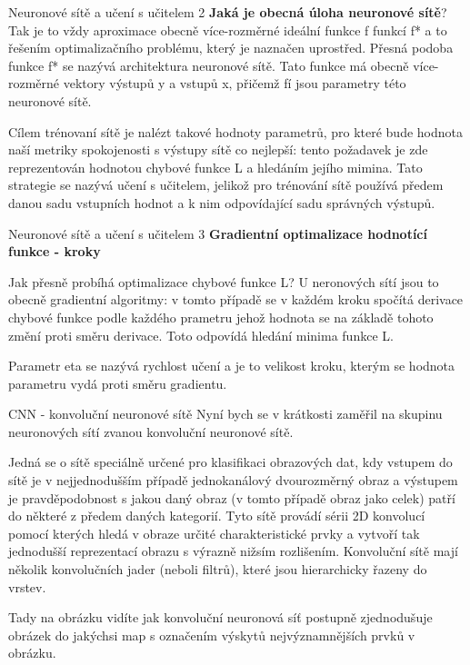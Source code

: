 \documentclass[aspectratio=1610]{beamer}
\begin{document}
\begin{frame}{Neuronové sítě a učení s učitelem 2}
\textbf{Jaká je obecná úloha neuronové sítě}? Tak je to vždy aproximace obecně více-rozměrné ideální funkce f funkcí f* a to řešením optimalizačního problému, který je naznačen uprostřed. Přesná podoba funkce f* se nazývá architektura neuronové sítě. Tato funkce má obecně více-rozměrné vektory výstupů y a vstupů x, přičemž fí jsou parametry této neuronové sítě.

Cílem trénovaní sítě je nalézt takové hodnoty parametrů, pro které bude hodnota naší metriky spokojenosti s výstupy sítě co nejlepší: tento požadavek je zde reprezentován hodnotou chybové funkce L a hledáním jejího mimina. Tato strategie se nazývá učení s učitelem, jelikož pro trénování sítě používá předem danou sadu vstupních hodnot a k nim odpovídající sadu správných výstupů.
\end{frame}
\begin{frame}{Neuronové sítě a učení s učitelem 3}
\textbf{Gradientní optimalizace hodnotící funkce - kroky}

Jak přesně probíhá optimalizace chybové funkce L? U neronových sítí jsou to obecně gradientní algoritmy: v tomto případě se v každém kroku spočítá derivace chybové funkce podle každého prametru jehož hodnota se na základě tohoto změní proti směru derivace. Toto odpovídá hledání minima funkce L. 

Parametr eta se nazývá rychlost učení a je to velikost kroku, kterým se hodnota parametru vydá proti směru gradientu.
\end{frame}
\begin{frame}{CNN - konvoluční neuronové sítě}
Nyní bych se v krátkosti zaměřil na skupinu neuronových sítí zvanou konvoluční neuronové sítě. 

Jedná se o sítě speciálně určené pro klasifikaci obrazových dat, kdy vstupem do sítě je v nejjednodušším případě jednokanálový dvourozměrný obraz a výstupem je pravděpodobnost s jakou daný obraz (v tomto případě obraz jako celek) patří do některé z předem daných kategorií. Tyto sítě provádí sérii 2D konvolucí pomocí kterých hledá v obraze určité charakteristické prvky a vytvoří tak jednodušší reprezentací obrazu s výrazně nižsím rozlišením. Konvoluční sítě mají několik konvolučních jader (neboli filtrů), které jsou hierarchicky řazeny do vrstev. 

Tady na obrázku vidíte jak konvoluční neuronová síť postupně zjednodušuje obrázek do jakýchsi map s označením výskytů nejvýznamnějších prvků v obrázku.
\end{frame}
\end{document}
